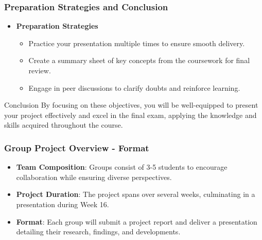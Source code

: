 \documentclass[aspectratio=169]{beamer}
\begin{document}
\begin{frame}[fragile]
    \frametitle{Preparation Strategies and Conclusion}
    \begin{itemize}
        \item \textbf{Preparation Strategies}
            \begin{itemize}
                \item Practice your presentation multiple times to ensure smooth delivery.
                \item Create a summary sheet of key concepts from the coursework for final review.
                \item Engage in peer discussions to clarify doubts and reinforce learning.
            \end{itemize}
    \end{itemize}
    
    \begin{block}{Conclusion}
        By focusing on these objectives, you will be well-equipped to present your project effectively and excel in the final exam, applying the knowledge and skills acquired throughout the course.
    \end{block}
\end{frame}

\begin{frame}[fragile]
    \frametitle{Group Project Overview - Format}
    \begin{itemize}
        \item \textbf{Team Composition}: Groups consist of 3-5 students to encourage collaboration while ensuring diverse perspectives.
        \item \textbf{Project Duration}: The project spans over several weeks, culminating in a presentation during Week 16.
        \item \textbf{Format}: Each group will submit a project report and deliver a presentation detailing their research, findings, and developments.
    \end{itemize}
\end{frame}
\end{document}
